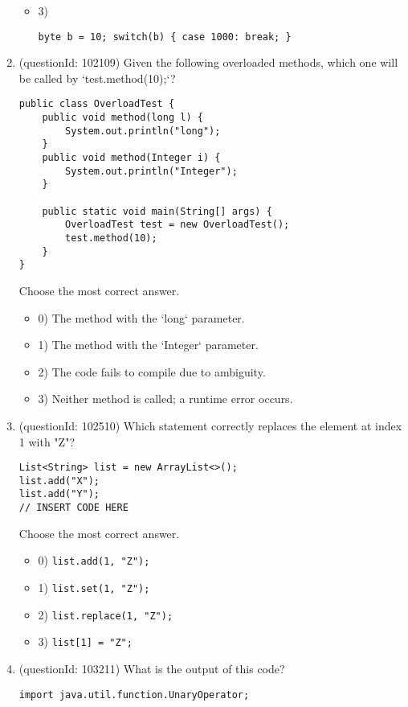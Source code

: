 \documentclass[12pt]{article}
\begin{document}
\begin{enumerate}[label=(\arabic*)]
\begin{itemize}
\item 3) \begin{verbatim}byte b = 10; switch(b) { case 1000: break; }
\end{verbatim}

\end{itemize}
\item (questionId: 102109) Given the following overloaded methods, which one will be called by `test.method(10);`?\n\begin{verbatim}
public class OverloadTest {
    public void method(long l) {
        System.out.println("long");
    }
    public void method(Integer i) {
        System.out.println("Integer");
    }
    
    public static void main(String[] args) {
        OverloadTest test = new OverloadTest();
        test.method(10);
    }
}
\end{verbatim}
Choose the most correct answer. 
\begin{itemize}
\item 0) The method with the `long` parameter.

\item 1) The method with the `Integer` parameter.

\item 2) The code fails to compile due to ambiguity.

\item 3) Neither method is called; a runtime error occurs.

\end{itemize}
\item (questionId: 102510) Which statement correctly replaces the element at index 1 with "Z"?\begin{verbatim}
List<String> list = new ArrayList<>();
list.add("X");
list.add("Y");
// INSERT CODE HERE
\end{verbatim}
Choose the most correct answer. 
\begin{itemize}
\item 0) \verb|list.add(1, "Z");|

\item 1) \verb|list.set(1, "Z");|

\item 2) \verb|list.replace(1, "Z");|

\item 3) \verb|list[1] = "Z";|

\end{itemize}
\item (questionId: 103211) What is the output of this code?
\begin{verbatim}
import java.util.function.UnaryOperator;


\end{verbatim}
\end{enumerate}
\end{document}
